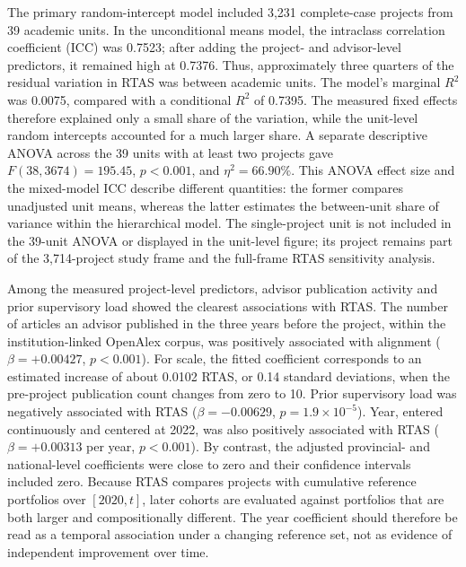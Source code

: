 \documentclass[pdflatex,sn-apa]{sn-jnl}
\begin{document}
The primary random-intercept model included 3,231 complete-case projects from 39 academic units. In the unconditional means model, the intraclass correlation coefficient (ICC) was 0.7523; after adding the project- and advisor-level predictors, it remained high at 0.7376. Thus, approximately three quarters of the residual variation in RTAS was between academic units. The model's marginal $R^2$ was 0.0075, compared with a conditional $R^2$ of 0.7395. The measured fixed effects therefore explained only a small share of the variation, while the unit-level random intercepts accounted for a much larger share. A separate descriptive ANOVA across the 39 units with at least two projects gave $F(38,3674)=195.45$, $p<0.001$, and $\eta^2=66.90\%$. This ANOVA effect size and the mixed-model ICC describe different quantities: the former compares unadjusted unit means, whereas the latter estimates the between-unit share of variance within the hierarchical model. The single-project unit is not included in the 39-unit ANOVA or displayed in the unit-level figure; its project remains part of the 3,714-project study frame and the full-frame RTAS sensitivity analysis.

Among the measured project-level predictors, advisor publication activity and prior supervisory load showed the clearest associations with RTAS. The number of articles an advisor published in the three years before the project, within the institution-linked OpenAlex corpus, was positively associated with alignment ($\beta=+0.00427$, $p<0.001$). For scale, the fitted coefficient corresponds to an estimated increase of about 0.0102 RTAS, or 0.14 standard deviations, when the pre-project publication count changes from zero to 10. Prior supervisory load was negatively associated with RTAS ($\beta=-0.00629$, $p=1.9\times10^{-5}$). Year, entered continuously and centered at 2022, was also positively associated with RTAS ($\beta=+0.00313$ per year, $p<0.001$). By contrast, the adjusted provincial- and national-level coefficients were close to zero and their confidence intervals included zero. Because RTAS compares projects with cumulative reference portfolios over $[2020,t]$, later cohorts are evaluated against portfolios that are both larger and compositionally different. The year coefficient should therefore be read as a temporal association under a changing reference set, not as evidence of independent improvement over time.
\end{document}
